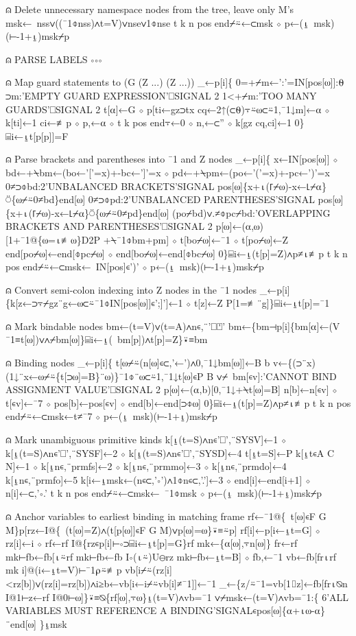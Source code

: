 \documentclass{article}%
\begin{document}
⍝ Delete unnecessary namespace nodes from the tree, leave only M's
   msk←~nss∨((¯1⌽nss)∧t=V)∨nse∨1⌽nse
   t k n pos end⌿⍨←⊂msk ⋄ p←(⍸~msk)(⊢-1+⍸)msk⌿p

⍝ PARSE LABELS ∘∘∘

⍝ Map guard statements to (G (Z ...) (Z ...))
   _←p[i]\{
     0=+⌿m←':'=IN[pos[⍵]]:⍬
     ⊃m:'EMPTY GUARD  EXPRESSION'⎕SIGNAL 2
     1<+⌿m:'TOO MANY GUARDS'⎕SIGNAL 2
     t[⍺]←G ⋄ p[ti←gz⊃tx cq←2↑(⊂⍬)⍪⍨⍵⊂⍨1,¯1↓m]←⍺ ⋄ k[ti]←1
     ci←≢p ⋄ p,←⍺ ⋄ t k pos end⍪←0 ⋄ n,←⊂'' ⋄ k[gz cq,ci]←1
   0\}⌸i←⍸t[p[p]]=F

⍝ Parse brackets and parentheses into ¯1 and Z nodes
   _←p[i]\{
     x←IN[pos[⍵]] ⋄ bd←+⍀bm←(bo←'['=x)+-bc←']'=x ⋄ pd←+⍀pm←(po←'('=x)+-pc←')'=x
     0≠⊃⌽bd:2'UNBALANCED BRACKETS'SIGNAL pos[⍵]\{x+⍳(⌈⌿⍵)-x←⌊⌿⍺\}⍥\{⍵⌿⍨0≠bd\}end[⍵]
     0≠⊃⌽pd:2'UNBALANCED PARENTHESES'SIGNAL pos[⍵]\{x+⍳(⌈⌿⍵)-x←⌊⌿⍺\}⍥\{⍵⌿⍨0≠pd\}end[⍵]
     (po⌿bd)∨.≠⌽pc⌿bd:'OVERLAPPING BRACKETS AND PARENTHESES'⎕SIGNAL 2
     p[⍵]←(⍺,⍵)[1+¯1@\{⍵=⍳≢⍵\}D2P +⍀¯1⌽bm+pm] ⋄ t[bo⌿⍵]←¯1 ⋄ t[po⌿⍵]←Z
     end[po⌿⍵]←end[⌽pc⌿⍵] ⋄ end[bo⌿⍵]←end[⌽bc⌿⍵]
   0\}⌸i←⍸(t[p]=Z)∧p≠⍳≢p
   t k n pos end⌿⍨←⊂msk←~IN[pos]∊')' ⋄ p←(⍸~msk)(⊢-1+⍸)msk⌿p

⍝ Convert semi-colon indexing into Z nodes in the ¯1 nodes
   _←p[i]\{k[z←⊃⍪⌿gz¨g←⍵⊂⍨¯1⌽IN[pos[⍵]]∊';]']←1 ⋄ t[z]←Z P[1=≢¨g]\}⌸i←⍸t[p]=¯1

⍝ Mark bindable nodes
   bm←(t=V)∨(t=A)∧n∊,¨'⎕⍞'
   bm←\{bm⊣p[i]\{bm[⍺]←(V ¯1≡t[⍵])∨∧⌿bm[⍵]\}⌸i←⍸(~bm[p])∧t[p]=Z\}⍣≡bm

⍝ Binding nodes
   _←p[i]\{
     t[⍵⌿⍨(n[⍵]∊⊂,'←')∧0,¯1↓bm[⍵]]←B
     b v←\{(⊃¨x)(1↓¨x←⍵⌿⍨\{t[⊃⍵]=B\}¨⍵)\}¯1⌽¨⍵⊂⍨1,¯1↓t[⍵]∊P B
     ∨⌿~bm[∊v]:'CANNOT BIND ASSIGNMENT VALUE'⎕SIGNAL 2
     p[⍵]←(⍺,b)[0,¯1↓+⍀t[⍵]=B]
     n[b]←n[∊v] ⋄ t[∊v]←¯7 ⋄ pos[b]←pos[∊v] ⋄ end[b]←end[⊃⌽⍵]
   0\}⌸i←⍸(t[p]=Z)∧p≠⍳≢p
   t k n pos end⌿⍨←⊂msk←t≠¯7 ⋄ p←(⍸~msk)(⊢-1+⍸)msk⌿p

⍝ Mark unambiguous primitive kinds
   k[⍸(t=S)∧n∊'⎕',¨SYSV]←1 ⋄ k[⍸(t=S)∧n∊'⎕',¨SYSF]←2 ⋄ k[⍸(t=S)∧n∊'⎕',¨SYSD]←4
   t[⍸t=S]←P
   k[⍸t∊A C N]←1 ⋄ k[⍸n∊,¨prmfs]←2 ⋄ k[⍸n∊,¨prmmo]←3 ⋄ k[⍸n∊,¨prmdo]←4
   k[⍸n∊,¨prmfo]←5
   k[i←⍸msk←(n∊⊂,'∘')∧1⌽n∊⊂,'.']←3 ⋄ end[i]←end[i+1] ⋄ n[i]←⊂,'∘.'
   t k n pos end⌿⍨←⊂msk←~¯1⌽msk ⋄ p←(⍸~msk)(⊢-1+⍸)msk⌿p

⍝ Anchor variables to earliest binding in matching frame
   rf←¯1@\{~t[⍵]∊F G M\}p[rz←I@\{~(t[⍵]=Z)∧(t[p[⍵]]∊F G M)∨p[⍵]=⍵\}⍣≡⍨p]
   rf[i]←p[i←⍸t=G] ⋄ rz[i]←i ⋄ rf←rf I@\{rz∊p[i]⊢∘⊃⌸i←⍸t[p]=G\}rf
   mk←\{⍺[⍵],⍪n[⍵]\}
   fr←rf mk⊢fb←fb[⍳⍨rf mk⊢fb←fb I∘(⍳⍨)U⊖rz mk⊢fb←⍸t=B] ⋄ fb,←¯1
   vb←fb[fr⍳rf mk i]@(i←⍸t=V)⊢¯1⍴⍨≢p
   vb[i⌿⍨(rz[i]<rz[b])∨(rz[i]=rz[b])∧i≥b←vb[i←i⌿⍨vb[i]≠¯1]]←¯1
   _←\{z/⍨¯1=vb[1⌷z]←fb[fr⍳⍉n I@1⊢z←rf I@0⊢⍵]\}⍣≡⍉\{rf[⍵],⍪⍵\}⍸(t=V)∧vb=¯1
   ∨⌿msk←(t=V)∧vb=¯1:\{
     6'ALL VARIABLES MUST REFERENCE A BINDING'SIGNAL∊pos[⍵]\{⍺+⍳⍵-⍺\}¨end[⍵]
   \}⍸msk
\end{document}
